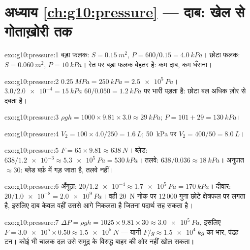 \section*{अध्याय \ref{ch:g10:pressure} --- दाब: खेल से गोताख़ोरी तक}

\begin{solution}{exo:g10:pressure:1}
बड़ा फलक: $S = \qty{0.15}{m^2}$, $P = 600/0.15 = \qty{4.0}{kPa}$। छोटा फलक: $S = \qty{0.060}{m^2}$, $P = \qty{10}{kPa}$। रेत पर बड़ा फलक बेहतर
है: कम दाब, कम धँसना।
\end{solution}

\begin{solution}{exo:g10:pressure:2}
$\qty{0.25}{MPa} = \qty{250}{kPa} = \qty{2.5e5}{Pa}$। $3.0/\num{2.0e-4} = \qty{15}{kPa}$ $60/0.050 = \qty{1.2}{kPa}$ पर भारी पड़ता है: छोटा बल अधिक ज़ोर से दबता
है।
\end{solution}

\begin{solution}{exo:g10:pressure:3}
$\rho g h = 1000 \times 9.81 \times 3.0 \approx \qty{29}{kPa}$;  $P = 101 + 29 = \qty{130}{kPa}$।
\end{solution}

\begin{solution}{exo:g10:pressure:4}
$V_2 = 100 \times 4.0 / 250 = \qty{1.6}{L}$; \qty{50}{kPa} पर $V_2 = 400/50 = \qty{8.0}{L}$।
\end{solution}

\begin{solution}{exo:g10:pressure:5}
$F = 65 \times 9.81 \approx \qty{638}{N}$। ब्लेड: $638/\num{1.2e-3} \approx \qty{5.3e5}{Pa} = \qty{530}{kPa}$। तलवे: $638/0.036 \approx \qty{18}{kPa}$। अनुपात $\approx 30$: ब्लेड बर्फ़ में गड़
जाता है, तलवे नहीं।
\end{solution}

\begin{solution}{exo:g10:pressure:6}
अँगूठा: $20/\num{1.2e-4} \approx \qty{1.7e5}{Pa} = \qty{170}{kPa}$। दीवार: $20/\num{1.0e-8} = \qty{2.0e9}{Pa}$। वही \qty{20}{N} नोक पर $12\,000$ गुना छोटे
क्षेत्रफल पर लगता है, इसलिए दाब केवल वहीं उससे आगे निकलता है
जितना पदार्थ सह सकता है।
\end{solution}

\begin{solution}{exo:g10:pressure:7}
$\Delta P = \rho g h = 1025 \times 9.81 \times 30 \approx
\qty{3.0e5}{Pa}$, इसलिए $F = \num{3.0e5} \times 0.50 \approx \qty{1.5e5}{N}$ --- यानी $F/g \approx \qty{1.5e4}{kg}$ का भार, पंद्रह टन। कोई भी
चालक दल उसे समुद्र के विरुद्ध बाहर की ओर नहीं खोल सकता।
\end{solution}

